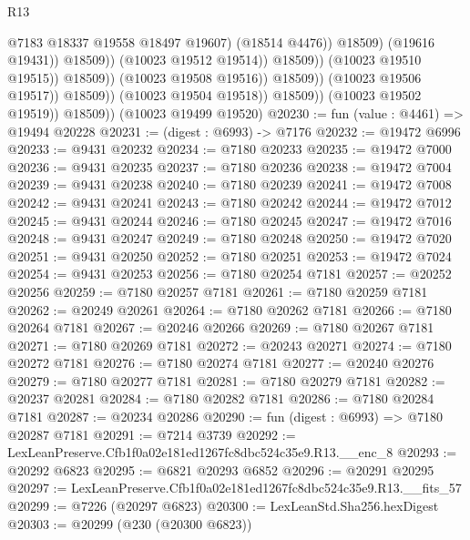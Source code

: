 \begin{lexlean}{R13}
\begin{coremodule}
                                                    @7183
                                                    @18337
                                                    @19558
                                                    @18497
                                                    @19607)
                                                  (@18514 @4476))
                                                @18509)
                                              (@19616 @19431))
                                            @18509))
                                        (@10023 @19512 @19514))
                                      @18509))
                                  (@10023 @19510 @19515))
                                @18509))
                            (@10023 @19508 @19516))
                          @18509))
                      (@10023 @19506 @19517))
                    @18509))
                (@10023 @19504 @19518))
              @18509))
          (@10023 @19502 @19519))
        @18509))
    (@10023 @19499 @19520)
@20230 := fun (value : @4461) => @19494 @20228
@20231 := (digest : @6993) -> @7176
@20232 := @19472 @6996
@20233 := @9431 @20232
@20234 := @7180 @20233
@20235 := @19472 @7000
@20236 := @9431 @20235
@20237 := @7180 @20236
@20238 := @19472 @7004
@20239 := @9431 @20238
@20240 := @7180 @20239
@20241 := @19472 @7008
@20242 := @9431 @20241
@20243 := @7180 @20242
@20244 := @19472 @7012
@20245 := @9431 @20244
@20246 := @7180 @20245
@20247 := @19472 @7016
@20248 := @9431 @20247
@20249 := @7180 @20248
@20250 := @19472 @7020
@20251 := @9431 @20250
@20252 := @7180 @20251
@20253 := @19472 @7024
@20254 := @9431 @20253
@20256 := @7180 @20254 @7181
@20257 := @20252 @20256
@20259 := @7180 @20257 @7181
@20261 := @7180 @20259 @7181
@20262 := @20249 @20261
@20264 := @7180 @20262 @7181
@20266 := @7180 @20264 @7181
@20267 := @20246 @20266
@20269 := @7180 @20267 @7181
@20271 := @7180 @20269 @7181
@20272 := @20243 @20271
@20274 := @7180 @20272 @7181
@20276 := @7180 @20274 @7181
@20277 := @20240 @20276
@20279 := @7180 @20277 @7181
@20281 := @7180 @20279 @7181
@20282 := @20237 @20281
@20284 := @7180 @20282 @7181
@20286 := @7180 @20284 @7181
@20287 := @20234 @20286
@20290 := fun (digest : @6993) => @7180 @20287 @7181
@20291 := @7214 @3739
@20292 := LexLeanPreserve.Cfb1f0a02e181ed1267fc8dbc524c35e9.R13.__enc_8
@20293 := @20292 @6823
@20295 := @6821 @20293 @6852
@20296 := @20291 @20295
@20297 := LexLeanPreserve.Cfb1f0a02e181ed1267fc8dbc524c35e9.R13.__fits_57
@20299 := @7226 (@20297 @6823)
@20300 := LexLeanStd.Sha256.hexDigest
@20303 := @20299 (@230 (@20300 @6823))

\end{coremodule}
\end{lexlean}

